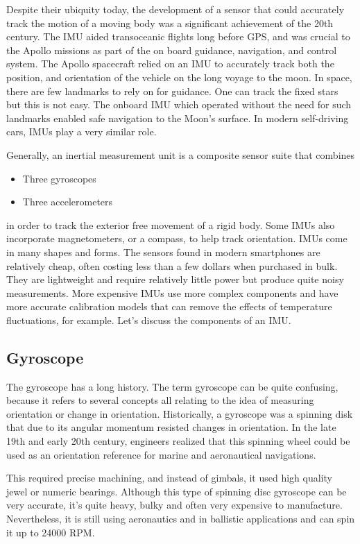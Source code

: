 Despite their ubiquity today, the development of a sensor that
could accurately track the motion of a moving body was a significant
achievement of the 20th century. The IMU aided transoceanic flights long
before GPS, and was crucial to the Apollo missions as part of the on board guidance,
navigation, and control system. The Apollo spacecraft relied on an IMU
to accurately track both the position, and orientation of the vehicle
on the long voyage to the moon. In space, there are few landmarks
to rely on for guidance. One can track the fixed stars but
this is not easy. The onboard IMU which
operated without the need for such landmarks enabled safe
navigation to the Moon's surface. In modern self-driving cars,
IMUs play a very similar role.  

Generally, an inertial measurement
unit is a composite sensor suite that combines 

\begin{itemize}
\item Three gyroscopes 
\item Three accelerometers 
\end{itemize}

in order to track the exterior
free movement of a rigid body. Some IMUs also incorporate magnetometers,
or a compass, to help track orientation. IMUs come in many shapes and forms. The sensors found in modern
smartphones are relatively cheap, often costing less than a few
dollars when purchased in bulk. They are lightweight and
require relatively little power but produce quite noisy measurements. More expensive IMUs use more complex
components and have more accurate calibration models that can remove the
effects of temperature fluctuations, for example. Let's discuss the components of an IMU. 

\subsection{Gyroscope}

The gyroscope has a long history. The term gyroscope can be quite confusing,
because it refers to several concepts all relating to the idea of measuring
orientation or change in orientation.  Historically, a gyroscope was
a spinning disk that due to its angular momentum resisted
changes in orientation. In the late 19th and early 20th century,
engineers realized that this spinning wheel could be used as
an orientation reference for marine and aeronautical navigations. 

This required precise machining,
and instead of gimbals, it used high quality jewel or
numeric bearings. Although this type of spinning disc
gyroscope can be very accurate, it's quite heavy, bulky and
often very expensive to manufacture. Nevertheless, it is still
using aeronautics and in ballistic applications and
can spin it up to 24000 RPM. 


